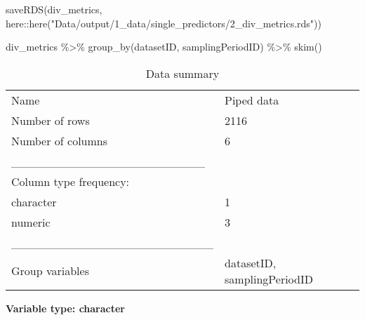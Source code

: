 \documentclass[
  letterpaper,
  DIV=11,
  numbers=noendperiod]{scrreprt}
\newenvironment{Shaded}{\begin{snugshade}}{\end{snugshade}}
\newcommand{\FunctionTok}[1]{\textcolor[rgb]{0.28,0.35,0.67}{#1}}
\newcommand{\NormalTok}[1]{\textcolor[rgb]{0.00,0.23,0.31}{#1}}
\newcommand{\SpecialCharTok}[1]{\textcolor[rgb]{0.37,0.37,0.37}{#1}}
\newcommand{\StringTok}[1]{\textcolor[rgb]{0.13,0.47,0.30}{#1}}
\begin{document}
\begin{Shaded}
\begin{Highlighting}[]
\FunctionTok{saveRDS}\NormalTok{(div\_metrics, here}\SpecialCharTok{::}\FunctionTok{here}\NormalTok{(}\StringTok{"Data/output/1\_data/single\_predictors/2\_div\_metrics.rds"}\NormalTok{))}
\end{Highlighting}
\end{Shaded}

\begin{Shaded}
\begin{Highlighting}[]
\NormalTok{div\_metrics }\SpecialCharTok{\%\textgreater{}\%}
  \FunctionTok{group\_by}\NormalTok{(datasetID, samplingPeriodID) }\SpecialCharTok{\%\textgreater{}\%}
  \FunctionTok{skim}\NormalTok{()}
\end{Highlighting}
\end{Shaded}

\begin{longtable}[]{@{}ll@{}}
\caption{Data summary}\tabularnewline
\toprule\noalign{}
\endfirsthead
\endhead
\bottomrule\noalign{}
\endlastfoot
Name & Piped data \\
Number of rows & 2116 \\
Number of columns & 6 \\
\_\_\_\_\_\_\_\_\_\_\_\_\_\_\_\_\_\_\_\_\_\_\_ & \\
Column type frequency: & \\
character & 1 \\
numeric & 3 \\
\_\_\_\_\_\_\_\_\_\_\_\_\_\_\_\_\_\_\_\_\_\_\_\_ & \\
Group variables & datasetID, samplingPeriodID \\
\end{longtable}

\textbf{Variable type: character}
\end{document}
